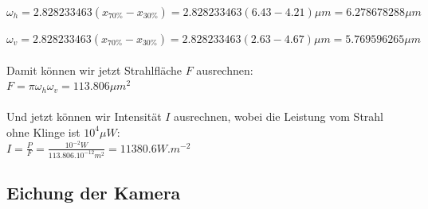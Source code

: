 \documentclass[12pt,a4paper]{article}
\begin{document}
  
  $\omega_h =2.828233463(x_{70\%}-x_{30\%})=2.828233463(6.43-4.21) \mu m=6.278678288  \mu m$ 
  
   $\omega_v =2.828233463(x_{70\%}-x_{30\%})=2.828233463(2.63-4.67) \mu m=5.769596265  \mu m$\\ \\
   Damit können wir jetzt Strahlfläche $F$ ausrechnen:\\
   
   $F=\pi \omega_h \omega_v =113.806 \mu m^2$\\ \\
   Und jetzt können wir Intensität $I$ ausrechnen, wobei die Leistung vom Strahl ohne Klinge ist $10^4 \mu W$:\\
   
   $I=\frac{P}{F}=\frac{10^{-2} W}{113.806 .10^{-12} m^2}=11380.6 W.m^{-2}$
  \subsection{Eichung der Kamera}
\end{document}
